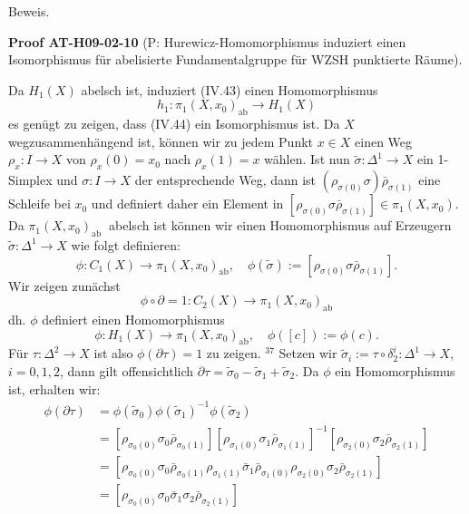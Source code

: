 \documentclass[10pt, letterpaper]{article}
\newcommand{\CustomHeading}[3]{%
  \par\medskip\noindent%
  \textbf{#1 #2} \textnormal{(#3)}.\enskip%
}
\newenvironment{PROOF}[2]{\begin{unitbox}\CustomHeading{Proof}{#1}{#2}}{\end{unitbox}}
\begin{document}
Beweis. 

\begin{PROOF}{AT-H09-02-10}{P: Hurewicz-Homomorphismus induziert einen Isomorphismus für abelisierte Fundamentalgruppe für WZSH punktierte Räume}
Da $H_1(X)$ abelsch ist, induziert (IV.43) einen Homomorphismus
$$
h_1: \pi_1\left(X, x_0\right)_{\mathrm{ab}} \rightarrow H_1(X)
$$
es genügt zu zeigen, dass (IV.44) ein Isomorphismus ist. Da $X$ wegzusammenhängend ist, können wir zu jedem Punkt $x \in X$ einen Weg $\rho_x: I \rightarrow X$ von $\rho_x(0)=x_0$ nach $\rho_x(1)=x$ wählen. Ist nun $\tilde{\sigma}: \Delta^1 \rightarrow X$ ein 1-Simplex und $\sigma: I \rightarrow X$ der entsprechende Weg, dann ist $\left(\rho_{\sigma(0)} \sigma\right) \bar{\rho}_{\sigma(1)}$ eine Schleife bei $x_0$ und definiert daher ein Element in $\left[\rho_{\sigma(0)} \sigma \bar{\rho}_{\sigma(1)}\right] \in \pi_1\left(X, x_0\right)$. Da $\pi_1\left(X, x_0\right)_{\text {ab }}$ abelsch ist können wir einen Homomorphismus auf Erzeugern $\tilde{\sigma}: \Delta^1 \rightarrow X$ wie folgt definieren:
$$
\phi: C_1(X) \rightarrow \pi_1\left(X, x_0\right)_{\mathrm{ab}}, \quad \phi(\tilde{\sigma}):=\left[\rho_{\sigma(0)} \sigma \bar{\rho}_{\sigma(1)}\right] .
$$
Wir zeigen zunächst
$$
\phi \circ \partial=1: C_2(X) \rightarrow \pi_1\left(X, x_0\right)_{\mathrm{ab}}
$$
dh. $\phi$ definiert einen Homomorphismus
$$
\phi: H_1(X) \rightarrow \pi_1\left(X, x_0\right)_{\mathrm{ab}}, \quad \phi([c]):=\phi(c) .
$$
Für $\tau: \Delta^2 \rightarrow X$ ist also $\phi(\partial \tau)=1$ zu zeigen. ${ }^{37}$ Setzen wir $\tilde{\sigma}_i:=\tau \circ \delta_2^i: \Delta^1 \rightarrow X$, $i=0,1,2$, dann gilt offensichtlich $\partial \tau=\tilde{\sigma}_0-\tilde{\sigma}_1+\tilde{\sigma}_2$. Da $\phi$ ein Homomorphismus ist, erhalten wir:
$$
\begin{aligned}
\phi(\partial \tau) & =\phi\left(\tilde{\sigma}_0\right) \phi\left(\tilde{\sigma}_1\right)^{-1} \phi\left(\tilde{\sigma}_2\right) \\
& =\left[\rho_{\sigma_0(0)} \sigma_0 \bar{\rho}_{\sigma_0(1)}\right]\left[\rho_{\sigma_1(0)} \sigma_1 \bar{\rho}_{\sigma_1(1)}\right]^{-1}\left[\rho_{\sigma_2(0)} \sigma_2 \bar{\rho}_{\sigma_2(1)}\right] \\
& =\left[\rho_{\sigma_0(0)} \sigma_0 \bar{\rho}_{\sigma_0(1)} \rho_{\sigma_1(1)} \bar{\sigma}_1 \bar{\rho}_{\sigma_1(0)} \rho_{\sigma_2(0)} \sigma_2 \bar{\rho}_{\sigma_2(1)}\right] \\
& =\left[\rho_{\sigma_0(0)} \sigma_0 \bar{\sigma}_1 \sigma_2 \bar{\rho}_{\sigma_2(1)}\right] \\

\end{aligned}$$
\end{PROOF}
\end{document}
